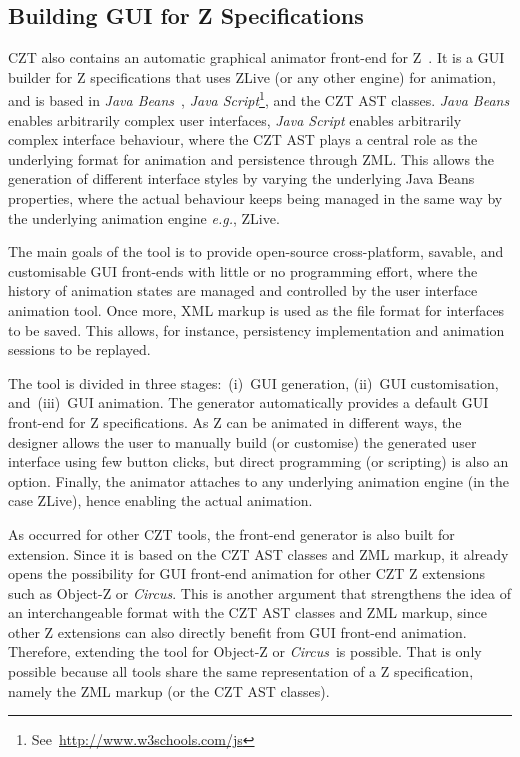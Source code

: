 \documentclass{llncs}
\newcommand{\Circus}{{\sf\slshape Circus}}
\begin{document}
\subsection{Building GUI for Z Specifications}



    CZT also contains an automatic graphical animator front-end for
    Z~\cite{daley2003}.  It is a GUI builder for Z specifications that
    uses ZLive (or any other engine) for animation, and is based in
    \textit{Java Beans}~\cite{javabeans}, \textit{Java
    Script}\footnote{See~\url{http://www.w3schools.com/js}}, and the
    CZT AST classes. \textit{Java Beans} enables arbitrarily complex
    user interfaces, \textit{Java Script} enables arbitrarily complex
    interface behaviour, where the CZT AST plays a central role as the
    underlying format for animation and persistence through ZML.  This
    allows the generation of different interface styles by varying the
    underlying Java Beans properties, where the actual behaviour keeps
    being managed in the same way by the underlying animation engine
    \textit{e.g.}, ZLive.

    The main goals of the tool is to provide open-source
    cross-platform, savable, and customisable GUI front-ends with
    little or no programming effort, where the history of animation
    states are managed and controlled by the user interface animation
    tool.  Once more, XML markup is used as the file format for
    interfaces to be saved.  This allows, for instance, persistency
    implementation and animation sessions to be replayed.

    The tool is divided in three stages:~(i)~GUI generation, (ii)~GUI
    customisation, and~(iii)~GUI animation. The generator
    automatically provides a default GUI front-end for Z
    specifications. As Z can be animated in different ways, the
    designer allows the user to manually build (or customise) the
    generated user interface using few button clicks, but direct
    programming (or scripting) is also an option.  Finally, the
    animator attaches to any underlying animation engine (in the case
    ZLive), hence enabling the actual animation.

    As occurred for other CZT tools, the front-end generator is also
    built for extension.  Since it is based on the CZT AST classes and
    ZML markup, it already opens the possibility for GUI front-end
    animation for other CZT Z extensions such as Object-Z or \Circus.
    This is another argument that strengthens the idea of an
    interchangeable format with the CZT AST classes and ZML markup,
    since other Z extensions can also directly benefit from GUI
    front-end animation. Therefore, extending the tool for Object-Z or
    \Circus\ is possible. That is only possible because all tools
    share the same representation of a Z specification, namely the ZML
    markup (or the CZT AST classes).
\end{document}
